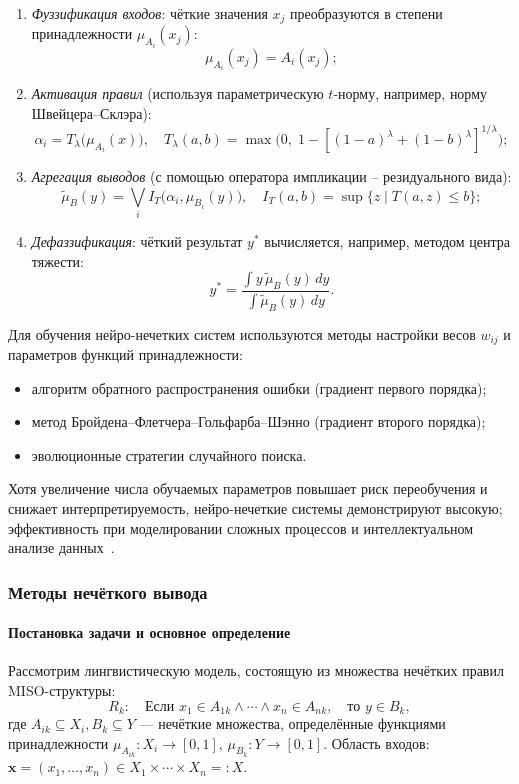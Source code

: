\begin{enumerate}
  \item \emph{Фуззификация входов}:
    чёткие значения \(x_j\) преобразуются в степени принадлежности
    \(\mu_{A_i}(x_j)\):
    \[
      \mu_{A_i}(x_j) = A_i(x_j);
    \]
  \item \emph{Активация правил} (используя параметрическую \(t\)-норму,
    например, норму Швейцера–Склэра):
    \[
      \alpha_i
      = T_{\lambda}\bigl(\mu_{A_i}(x)\bigr),
      \quad
      T_{\lambda}(a,b)
      = \max\!\bigl(0,\;1-[(1-a)^\lambda + (1-b)^\lambda]^{1/\lambda}\bigr);
    \]
  \item \emph{Агрегация выводов} (с помощью оператора импликации –
    резидуального вида):
    \[
      \tilde{\mu}_B(y)
      = \bigvee_i I_T\bigl(\alpha_i,\mu_{B_i}(y)\bigr),
      \quad
      I_T(a,b)
      = \sup\{z\mid T(a,z)\le b\};
    \]
  \item \emph{Дефаззификация}: чёткий результат \(y^*\) вычисляется, например,
    методом центра тяжести:
    \[
      y^*
      = \frac{\displaystyle \int y\,\tilde{\mu}_B(y)\,dy}
             {\displaystyle \int \tilde{\mu}_B(y)\,dy}.
    \]
\end{enumerate}
\newpage
Для обучения нейро-нечетких систем используются методы настройки
весов \(w_{ij}\) и параметров функций принадлежности:
\begin{itemize}
  \item алгоритм обратного распространения ошибки (градиент первого порядка);
  \item метод Бройдена–Флетчера–Гольфарба–Шэнно (градиент второго порядка);
  \item эволюционные стратегии случайного поиска.
\end{itemize}
\medskip
Хотя увеличение числа обучаемых параметров повышает риск переобучения и
снижает интерпретируемость, нейро-нечеткие системы демонстрируют высокую;
эффективность при моделировании сложных процессов и интеллектуальном
анализе данных~.


\subsubsection{Методы нечёткого вывода}
\paragraph{Постановка задачи и основное определение}
Рассмотрим лингвистическую модель, состоящую из множества нечётких правил MISO-структуры:
\begin{equation}
  R_k:\quad
  \text{Если }x_1\in A_{1k}\wedge\cdots\wedge x_n\in A_{nk},\quad
  \text{то }y\in B_k,
  \label{eq:rule_general}
\end{equation}
где $A_{ik}\subseteq X_i, B_k\subseteq Y$ — нечёткие множества,
определённые функциями принадлежности
$\mu_{A_{ik}}:X_i\to[0,1]$, $\mu_{B_k}:Y\to[0,1]$.
Область входов: $\mathbf{x}=(x_1,\dots,x_n)\in X_1\times\cdots\times X_n=:X$.

